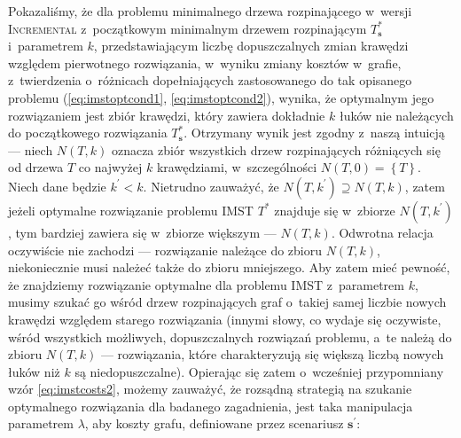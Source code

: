 Pokazaliśmy, że dla problemu minimalnego drzewa rozpinającego w~wersji \textsc{Incremental} z~początkowym minimalnym drzewem rozpinającym $T^{\ast}_{\textbf{s}}$ i~parametrem $k$, przedstawiającym liczbę dopuszczalnych zmian krawędzi względem pierwotnego rozwiązania, w~wyniku zmiany kosztów w~grafie, z~twierdzenia o~różnicach dopełniających zastosowanego do tak opisanego problemu (\ref{eq:imstoptcond1}, \ref{eq:imstoptcond2}), wynika, że optymalnym jego rozwiązaniem jest zbiór krawędzi, który zawiera dokładnie $k$ łuków nie należących do początkowego rozwiązania $T^{\ast}_{\textbf{s}}$.
Otrzymany wynik jest zgodny z~naszą intuicją --- niech $N \left( T, k \right)$ oznacza zbiór wszystkich drzew rozpinających różniących się od drzewa $T$ co najwyżej $k$ krawędziami, w~szczególności $N \left( T, 0 \right) = \left\{ T \right\}$.
Niech dane będzie $k^{\prime} < k$.
Nietrudno zauważyć, że $N \left( T, k^{\prime} \right) \supseteq N \left( T, k \right)$, zatem jeżeli optymalne rozwiązanie problemu \textsc{IMST} $T^{\ast}$ znajduje się w~zbiorze $N \left( T, k^{\prime} \right)$, tym bardziej zawiera się w~zbiorze większym --- $N \left( T, k \right)$.
Odwrotna relacja oczywiście nie zachodzi --- rozwiązanie należące do zbioru $N \left( T, k \right)$, niekoniecznie musi należeć także do zbioru mniejszego.
Aby zatem mieć pewność, że znajdziemy rozwiązanie optymalne dla problemu \textsc{IMST} z~parametrem $k$, musimy szukać go wśród drzew rozpinających graf o~takiej samej liczbie nowych krawędzi względem starego rozwiązania (innymi słowy, co wydaje się oczywiste, wśród wszystkich możliwych, dopuszczalnych rozwiązań problemu, a~te należą do zbioru $N \left( T, k \right)$ --- rozwiązania, które charakteryzują się większą liczbą nowych łuków niż $k$ są niedopuszczalne).
Opierając się zatem o~wcześniej przypomniany wzór \ref{eq:imstcosts2}, możemy zauważyć, że rozsądną strategią na szukanie optymalnego rozwiązania dla badanego zagadnienia, jest taka manipulacja parametrem $\lambda$, aby koszty grafu, definiowane przez scenariusz $\textbf{s}^{\prime}$:

